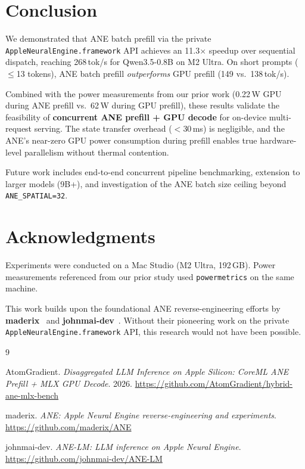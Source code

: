 \documentclass[11pt]{article}
\begin{document}
\section{Conclusion}
\label{sec:conclusion}

We demonstrated that ANE batch prefill via the private
\texttt{AppleNeuralEngine.framework} API achieves an 11.3$\times$
speedup over sequential dispatch, reaching 268\,tok/s for Qwen3.5-0.8B
on M2 Ultra. On short prompts ($\leq$13 tokens), ANE batch prefill
\emph{outperforms} GPU prefill (149 vs.\ 138\,tok/s).

Combined with the power measurements from our prior work (0.22\,W GPU
during ANE prefill vs.\ 62\,W during GPU prefill), these results validate
the feasibility of \textbf{concurrent ANE prefill + GPU decode} for
on-device multi-request serving. The state transfer overhead ($<$30\,ms)
is negligible, and the ANE's near-zero GPU power consumption during
prefill enables true hardware-level parallelism without thermal
contention.

Future work includes end-to-end concurrent pipeline benchmarking,
extension to larger models (9B+), and investigation of the ANE batch size
ceiling beyond \texttt{ANE\_SPATIAL=32}.

\section*{Acknowledgments}

Experiments were conducted on a Mac Studio (M2 Ultra, 192\,GB). Power
measurements referenced from our prior study used \texttt{powermetrics}
on the same machine.

This work builds upon the foundational ANE reverse-engineering efforts
by \textbf{maderix}~\cite{maderix2024ane} and
\textbf{johnmai-dev}~\cite{johnmai2024anelm}. Without their pioneering
work on the private \texttt{AppleNeuralEngine.framework} API, this
research would not have been possible.

\begin{thebibliography}{9}

AtomGradient.
\textit{Disaggregated LLM Inference on Apple Silicon: CoreML ANE Prefill
+ MLX GPU Decode}.
2026.
\url{https://github.com/AtomGradient/hybrid-ane-mlx-bench}

maderix.
\textit{ANE: Apple Neural Engine reverse-engineering and experiments}.
\url{https://github.com/maderix/ANE}

johnmai-dev.
\textit{ANE-LM: LLM inference on Apple Neural Engine}.
\url{https://github.com/johnmai-dev/ANE-LM}

\end{thebibliography}
\end{document}

